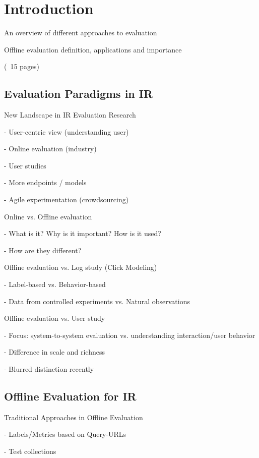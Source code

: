 \documentclass[openany]{now} %
\newcommand{\newpar}{\bigskip\noindent}
\begin{document}
\chapter{Introduction}
\label{c-intro}

An overview of different approaches to evaluation

Offline evaluation definition, applications and importance

(~15 pages)

\section{Evaluation Paradigms in IR}

\newpar
New Landscape in IR Evaluation Research

- User-centric view (understanding user)

- Online evaluation (industry)

- User studies

- More endpoints / models

- Agile experimentation (crowdsourcing)

\newpar
Online \cite{INR-XYZ} vs. Offline evaluation \cite{INR-009} 

- What is it? Why is it important? How is it used?

- How are they different?


\newpar
Offline evaluation vs. Log study (Click Modeling) \cite{chuklin2015click}

- Label-based vs. Behavior-based

- Data from controlled experiments vs. Natural observations

\newpar
Offline evaluation vs. User study \cite{kelly2009methods}

- Focus: system-to-system evaluation vs. understanding interaction/user behavior

- Difference in scale and richness

- Blurred distinction recently
\cite{Bron:2013}
\cite{Liu:2014}
\cite{Shah:2011}


\section{Offline Evaluation for IR}

Traditional Approaches in Offline Evaluation

- Labels/Metrics based on Query-URLs

- Test collections 
\end{document}
